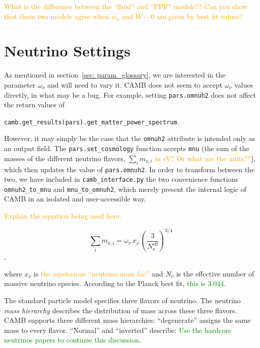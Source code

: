 \textcolor{orange}{What is the difference between the ``fluid'' and ``PPF''
models?? Can you show that these two models agree when $w_a$ and $W-0$ are
given by best fit values?}

\section{Neutrino Settings}


As mentioned in section~\ref{sec: param_glossary}, we are interested in the
parameter $\omega_\nu$ and will need to vary it. CAMB does not seem to accept
$\omega_\nu$ values directly, in what may be a bug. For example, setting
\verb|pars.omnuh2| does not affect the return values of

\verb|camb.get_results(pars).get_matter_power_spectrum|.

However, it may simply be the case that the \verb|omnuh2| attribute is
intended only as an output field. The \verb|pars.set_cosmology| function
accepts \verb|mnu| (the sum of the masses of the different neutrino flavors,
$\sum_i m_{\nu, i}$ \textcolor{orange}{in eV? Or what are the units??}),
which then updates the value of \verb|pars.omnuh2|.
In order to transform between the two, we have included in
\verb|camb_interface.py| the two convenience functions
\verb|omnuh2_to_mnu| and \verb|mnu_to_omnuh2|, which merely present the 
internal logic of CAMB in an isolated and user-accessible way.

\textcolor{orange}{Explain the equation being used here:}

\begin{equation}
\sum_i m_{\nu, i}
=
\omega_\nu \, x_\nu \, \left( \frac{3}{N_\nu^\text{eff}} \right)^{3/4}
\end{equation},

where $x_\nu$ is \textcolor{orange}{the mysterious ``neutrino mass fac''} and
$N_\nu$ is the effective number of massive neutrino species. According to the
Planck best fit, \textcolor{green}{this is 3.044}.

The standard particle model specifies three flavors of neutrino. The neutrino
\textit{mass hierarchy} describes the distribution of mass across these three
flavors. CAMB supports three different mass hierarchies: ``degenerate''
assigns the same mass to every flavor. ``Normal'' and ``inverted'' describe:
\textcolor{green}{Use the hardcore neutrinos papers to continue this
discussion}.

